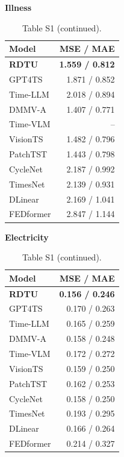 \begin{table}[H]\centering\small
\caption*{Table S1 (continued).}
\begin{minipage}[t]{0.48\linewidth}\vspace{0pt}\centering\small
\textbf{Illness}\par\smallskip
\begin{tabular}{lr}\toprule Model & MSE / MAE\\\midrule
\rowcolor{blue!5}
\textbf{RDTU} & \textbf{1.559 / 0.812}\\
GPT4TS & 1.871 / 0.852\\
Time-LLM & 2.018 / 0.894\\
DMMV-A & 1.407 / 0.771\\
Time-VLM & --\\
VisionTS & 1.482 / 0.796\\
PatchTST & 1.443 / 0.798\\
CycleNet & 2.187 / 0.992\\
TimesNet & 2.139 / 0.931\\
DLinear & 2.169 / 1.041\\
FEDformer & 2.847 / 1.144\\
\bottomrule\end{tabular}\end{minipage}\hfill\begin{minipage}[t]{0.48\linewidth}\vspace{0pt}\centering\small
\textbf{Electricity}\par\smallskip
\begin{tabular}{lr}\toprule Model & MSE / MAE\\\midrule
\rowcolor{blue!5}
\textbf{RDTU} & \textbf{0.156 / 0.246}\\
GPT4TS & 0.170 / 0.263\\
Time-LLM & 0.165 / 0.259\\
DMMV-A & 0.158 / 0.248\\
Time-VLM & 0.172 / 0.272\\
VisionTS & 0.159 / 0.250\\
PatchTST & 0.162 / 0.253\\
CycleNet & 0.158 / 0.250\\
TimesNet & 0.193 / 0.295\\
DLinear & 0.166 / 0.264\\
FEDformer & 0.214 / 0.327\\
\bottomrule\end{tabular}\end{minipage}
\end{table}
